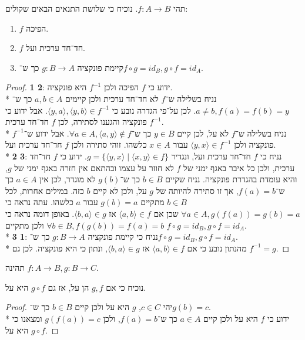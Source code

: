 \Question{}
תהי $f : A \to B$.
נוכיח כי שלושת התנאים הבאים שקולים:
\begin{enumerate}
	\item $f$ הפיכה.
	\item $f$ חד־חד ערכית ועל.
	\item קיימת פונקציה $g : B \to A$ כך ש־$f \circ g = id_B, g \circ f = id_A$.
\end{enumerate}
\begin{proof}
	\textbf{1 \leftarrow{} 2}:
	ידוע כי $f$ הפיכה ולכן $f^{-1}$ היא פונקציה. \\*
	נניח בשלילה ש־$f$ לא חד־חד ערכית ולכן קיימים $a, b \in A$ כך ש־$a \ne b, f(a) = f(b) = y$.
	לכן על־פי הגדרה נובע כי $\langle y, a \rangle, \langle y, b \rangle \in f^{-1}$.
	אבל ידוע כי $f^{-1}$ פונקציה והגענו לסתירה, לכן $f$ חד־חד ערכית. \\*
	נניח בשלילה ש־$f$ לא על, לכן קיים $y \in B$ כך ש־$\forall a \in A, \langle a, y \rangle \not\in f$. אבל ידוע ש־$f^{-1}$ פונקציה ולכן $\langle y, x \rangle \in f^{-1}$ עבור $x \in A$ כלשהו.
	זוהי סתירה ולכן $f$ חד־חד ערכית ועל. \\*
	\textbf{2 \leftarrow{} 3}:
	נניח כי $f$ חד־חד ערכית ועל, ונגדיר $g = \{ \langle y, x \rangle \mid \langle x, y \rangle \in f \}$.
	ידוע כי $f$ חד־חד ערכית, ולכן כל איבר באגף ימני של $f$ לא חוזר על עצמו ובהתאם אין חזרה באגף ימני של $g$, והיא עומדת בהגדרת פונקציה.
	נניח שקיים $b \in B$ כך ש־$g(b)$ לא מוגדר, לכן אין $a \in A$ כך ש־$f(a) = b$, אך זו סתירה להיותה של $g$ על, ולכן לא קיים $b$ כזה.
	במילים אחרות, לכל $b \in B$ מתקיים $g(b) = a$ עבור $a$ כלשהו.
	עתה נראה כי $\forall a \in A, g(f(a)) = g(b) = a$ שכן אם $\langle a, b \rangle \in f$ אז $\langle b, a \rangle \in g$.
	באופן דומה נראה כי $\forall b \in B, f(g(b)) = f(a) = b$ ולכן מתקיים $f \circ g = id_B, g \circ f = id_A$. \\*
	\textbf{3 \leftarrow{} 1}:
	נניח כי קיימת פונקציה $g : B \to A$ כך ש־$f \circ g = id_B, g \circ f = id_A$. \\*
	מהנתון נובע כי אם $\langle a, b \rangle \in f$ אז $\langle b, a\rangle \in g$, ונתון כי היא פונקציה.
	לכן גם $f^{-1} = g$.
\end{proof}

\Question{}
תהינה $f : A \to B, g : B \to C$.

\Subquestion{}
נוכיח כי אם $g, f$ הן על, אז גם $g \circ f$ היא על.
\begin{proof}
	יהי $c \in C$, $g$ היא על ולכן קיים $b \in B$ כך ש־$g(b) = c$. \\*
	ידוע כי $f$ היא על ולכן קיים $a \in A$ כך ש־$f(a) = b$, ולכן $g(f(a)) = c$ ומצאנו כי $g \circ f$ היא על.
\end{proof}

